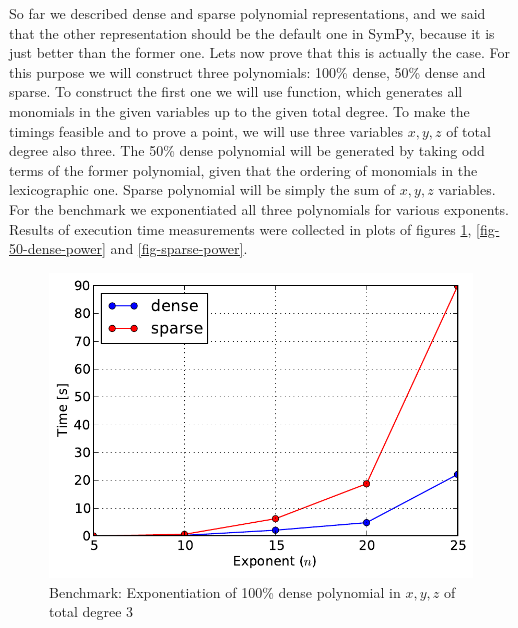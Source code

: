 So far we described dense and sparse polynomial representations, and we said that the
other representation should be the default one in SymPy, because it is just better
than the former one. Lets now prove that this is actually the case. For this purpose
we will construct three polynomials: 100\% dense, 50\% dense and sparse. To construct
the first one we will use  function, which generates all monomials
in the given variables up to the given total degree. To make the timings feasible and
to prove a point, we will use three variables $x,y,z$ of total degree also three. The
50\% dense polynomial will be generated by taking odd terms of the former polynomial,
given that the ordering of monomials in the lexicographic one. Sparse polynomial will
be simply the sum of $x,y,z$ variables. For the benchmark we exponentiated all three
polynomials for various exponents. Results of execution time measurements were collected
in plots of figures \ref{fig-100-dense-power}, \ref{fig-50-dense-power} and
\ref{fig-sparse-power}.
\begin{figure}[htbp]
\centering

\includegraphics{100-dense-power.pdf}
\caption{Benchmark: Exponentiation of 100\% dense polynomial in $x,y,z$ of total degree 3\label{fig-100-dense-power}}\end{figure}
